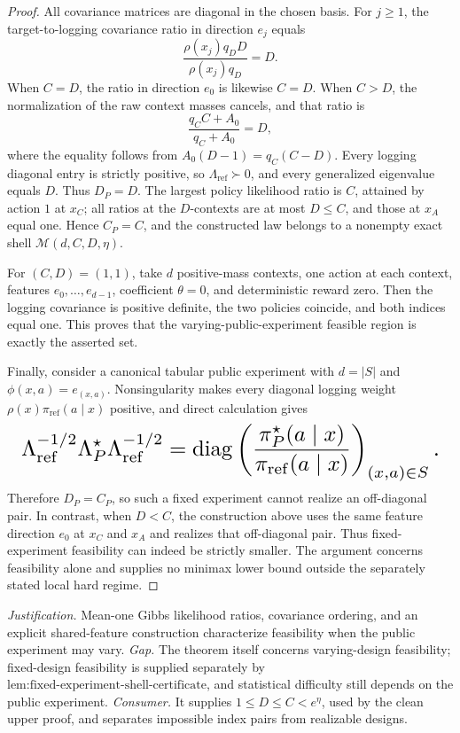 \documentclass{article}
\begin{document}
\begin{proof}
All covariance matrices are diagonal in the chosen basis. For \(j\ge1\), the target-to-logging covariance ratio in direction \(e_j\) equals
\[
\frac{\rho(x_j)q_DD}{\rho(x_j)q_D}=D.
\]
When \(C=D\), the ratio in direction \(e_0\) is likewise \(C=D\). When \(C>D\), the normalization of the raw context masses cancels, and that ratio is
\[
\frac{q_CC+A_0}{q_C+A_0}=D,
\]
where the equality follows from \(A_0(D-1)=q_C(C-D)\). Every logging diagonal entry is strictly positive, so \(\Lambda_{\mathrm{ref}}\succ0\), and every generalized eigenvalue equals \(D\). Thus \(D_P=D\). The largest policy likelihood ratio is \(C\), attained by action \(1\) at \(x_C\); all ratios at the \(D\)-contexts are at most \(D\le C\), and those at \(x_A\) equal one. Hence \(C_P=C\), and the constructed law belongs to a nonempty exact shell \(\mathcal M(d,C,D,\eta)\).

For \((C,D)=(1,1)\), take \(d\) positive-mass contexts, one action at each context, features \(e_0,\ldots,e_{d-1}\), coefficient \(\theta=0\), and deterministic reward zero. Then the logging covariance is positive definite, the two policies coincide, and both indices equal one. This proves that the varying-public-experiment feasible region is exactly the asserted set.

Finally, consider a canonical tabular public experiment with \(d=|S|\) and \(\phi(x,a)=e_{(x,a)}\). Nonsingularity makes every diagonal logging weight \(\rho(x)\pi_{\mathrm{ref}}(a\mid x)\) positive, and direct calculation gives
\[
\makebox[\linewidth][c]{\resizebox{0.98\linewidth}{!}{\(\displaystyle \Lambda_{\mathrm{ref}}^{-1/2}\Lambda_P^\star\Lambda_{\mathrm{ref}}^{-1/2}
=\operatorname{diag}\left(
\frac{\pi_P^\star(a\mid x)}{\pi_{\mathrm{ref}}(a\mid x)}
\right)_{(x,a)\in S}.\)}}
\]
Therefore \(D_P=C_P\), so such a fixed experiment cannot realize an off-diagonal pair. In contrast, when \(D<C\), the construction above uses the same feature direction \(e_0\) at \(x_C\) and \(x_A\) and realizes that off-diagonal pair. Thus fixed-experiment feasibility can indeed be strictly smaller. The argument concerns feasibility alone and supplies no minimax lower bound outside the separately stated local hard regime.
\end{proof}
\par\smallskip\noindent \textit{Justification.} Mean-one Gibbs likelihood ratios, covariance ordering, and an explicit shared-feature construction characterize feasibility when the public experiment may vary. \textit{Gap.} The theorem itself concerns varying-design feasibility; fixed-design feasibility is supplied separately by \(\text{lem:fixed-experiment-shell-certificate}\), and statistical difficulty still depends on the public experiment. \textit{Consumer.} It supplies \(1\le D\le C<e^\eta\), used by the clean upper proof, and separates impossible index pairs from realizable designs.
\end{document}
